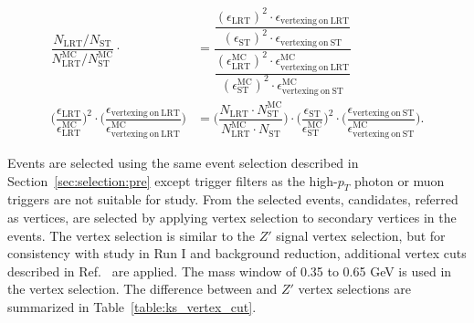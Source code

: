 \begin{align}
    \dfrac{N_{\mathrm{LRT}} / N_{\mathrm{ST}}}{N_{\mathrm{LRT}}^{\mathrm{MC}} / N_{\mathrm{ST}}^{\mathrm{MC}}} \cdot &=
    \dfrac{\dfrac{(\epsilon_{\mathrm{LRT}})^{2} \cdot \epsilon_{\mathrm{vertexing~on~LRT}}}{(\epsilon_{\mathrm{ST}})^{2} \cdot \epsilon_{\mathrm{vertexing~on~ST}}}}{\dfrac{(\epsilon_{\mathrm{LRT}}^{\mathrm{MC}})^{2} \cdot \epsilon_{\mathrm{vertexing~on~LRT}}^{\mathrm{MC}}}{(\epsilon_{\mathrm{ST}}^{\mathrm{MC}})^{2} \cdot \epsilon_{\mathrm{vertexing~on~ST}}^{\mathrm{MC}}}} 
    \\[10pt]
    \Big( \dfrac{\epsilon_{\mathrm{LRT}}}{\epsilon_{\mathrm{LRT}}^{\mathrm{MC}}}\Big)^{2} \cdot
    \Big( \dfrac{\epsilon_{\mathrm{vertexing~on~LRT}}}{\epsilon_{\mathrm{vertexing~on~LRT}}^{\mathrm{MC}}}\Big) &=
    \Big( \dfrac{N_{\mathrm{LRT}} \cdot N_{\mathrm{ST}}^{\mathrm{MC}}}{N_{\mathrm{LRT}}^{\mathrm{MC}} \cdot N_{\mathrm{ST}}} \Big) \cdot
    \Big( \dfrac{\epsilon_{\mathrm{ST}}}{\epsilon_{\mathrm{ST}}^{\mathrm{MC}}}\Big)^{2} \cdot
    \Big( \dfrac{\epsilon_{\mathrm{vertexing~on~ST}}}{\epsilon_{\mathrm{vertexing~on~ST}}^{\mathrm{MC}}}\Big).
\label{eq:Ks_eq3}
\end{align}

Events are selected using the same event selection described in Section~\ref{sec:selection:pre} except trigger filters as the high-$p_{T}$ photon or muon triggers are not suitable for \Ks study. From the selected events, \Ks candidates, referred as \Ks vertices, are selected by applying \Ks vertex selection to secondary vertices in the events. The \Ks vertex selection is similar to the $Z'$ signal vertex selection, but for consistency with \Ks study in Run I and background reduction, additional vertex cuts described in Ref.~\cite{Aad:2011hd} are applied. The mass window of 0.35 to 0.65 GeV is used in the \Ks vertex selection. The difference between \Ks and $Z'$ vertex selections are summarized in Table~\ref{table:ks_vertex_cut}. %

